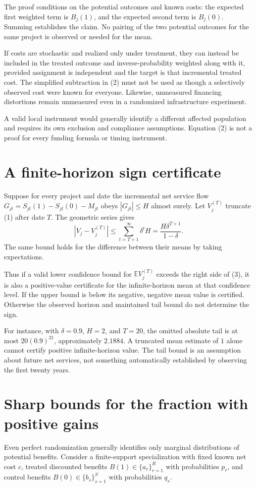 \documentclass[11pt,a4paper]{article}
\newcommand{\E}{\mathbb E}
\begin{document}
The proof conditions on the potential outcomes and known costs: the expected first weighted term is $B_j(1)$, and the expected second term is $B_j(0)$. Summing establishes the claim. No pairing of the two potential outcomes for the same project is observed or needed for the mean.

If costs are stochastic and realized only under treatment, they can instead be included in the treated outcome and inverse-probability weighted along with it, provided assignment is independent and the target is that incremental treated cost. The simplified subtraction in (2) must not be used as though a selectively observed cost were known for everyone. Likewise, unmeasured financing distortions remain unmeasured even in a randomized infrastructure experiment.

A valid local instrument would generally identify a different affected population and requires its own exclusion and compliance assumptions. Equation (2) is not a proof for every funding formula or timing instrument.
\section{A finite-horizon sign certificate}
Suppose for every project and date the incremental net service flow
$G_{jt}=S_{jt}(1)-S_{jt}(0)-M_{jt}$ obeys $|G_{jt}|\le H$ almost surely. Let $V_j^{(T)}$ truncate (1) after date $T$. The geometric series gives
\[
 |V_j-V_j^{(T)}|
 \le\sum_{t=T+1}^\infty\delta^t H
 =\frac{H\delta^{T+1}}{1-\delta}.
 \tag{3}
\]
The same bound holds for the difference between their means by taking expectations.

Thus if a valid lower confidence bound for $\E V_j^{(T)}$ exceeds the right side of (3), it is also a positive-value certificate for the infinite-horizon mean at that confidence level. If the upper bound is below its negative, negative mean value is certified. Otherwise the observed horizon and maintained tail bound do not determine the sign.

For instance, with $\delta=0.9$, $H=2$, and $T=20$, the omitted absolute tail is at most $20(0.9)^{21}$, approximately $2.1884$. A truncated mean estimate of $1$ alone cannot certify positive infinite-horizon value. The tail bound is an assumption about future net services, not something automatically established by observing the first twenty years.
\section{Sharp bounds for the fraction with positive gains}
Even perfect randomization generally identifies only marginal distributions of potential benefits. Consider a finite-support specialization with fixed known net cost $c$, treated discounted benefits $B(1)\in\{a_r\}_{r=1}^R$ with probabilities $p_r$, and control benefits $B(0)\in\{b_s\}_{s=1}^S$ with probabilities $q_s$.
\end{document}
